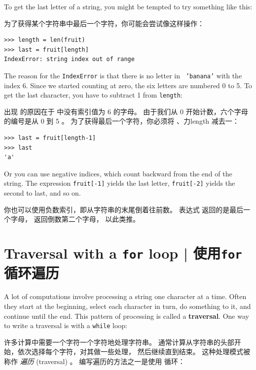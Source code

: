%
To get the last letter of a string, you might be tempted to try something
like this:
  

为了获得某个字符串中最后一个字符，你可能会尝试像这样操作：

\begin{lstlisting}
>>> length = len(fruit)
>>> last = fruit[length]
IndexError: string index out of range
\end{lstlisting}

%
The reason for the {\tt IndexError} is that there is no letter in {\tt
'banana'} with the index 6.  Since we started counting at zero, the
six letters are numbered 0 to 5.  To get the last character, you have
to subtract 1 from {\tt length}:

出现  的原因在于  中没有索引值为 6 的字母。 由于我们从 0 开始计数，六个字母的编号是从 0 到 5 。 为了获得最后一个字符，你必须将 、力{length} 减去一：

\begin{lstlisting}
>>> last = fruit[length-1]
>>> last
'a'
\end{lstlisting}

%
Or you can use negative indices, which count backward from
the end of the string.  The expression {\tt fruit[-1]} yields the last
letter, {\tt fruit[-2]} yields the second to last, and so on.
  

你也可以使用负数索引，即从字符串的末尾倒着往前数。 表达式  返回的是最后一个字母，  返回倒数第二个字母， 以此类推。
  
  


\section{Traversal with a {\tt for} loop  |  使用{\tt for}循环遍历}
\label{for}
  
  
  

A lot of computations involve processing a string one character at a
time.  Often they start at the beginning, select each character in
turn, do something to it, and continue until the end.  This pattern of
processing is called a {\bf traversal}.  One way to write a traversal
is with a {\tt while} loop:

许多计算中需要一个字符一个字符地处理字符串。 通常计算从字符串的头部开始，依次选择每个字符，对其做一些处理，
然后继续直到结束。 这种处理模式被称作 {\em 遍历} (traversal) 。 编写遍历的方法之一是使用  循环：


